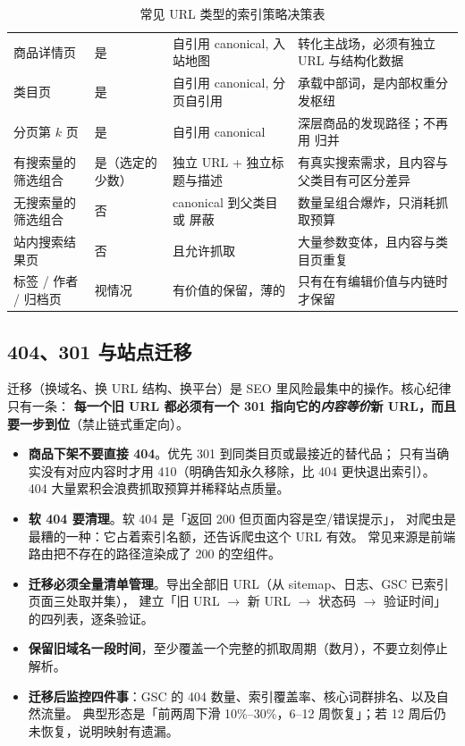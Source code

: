 \begin{table}[htbp]
\centering
\caption{常见 URL 类型的索引策略决策表}
\label{tab:urlpolicy}
\small
\begin{tabularx}{\textwidth}{L{2.7cm} L{2.0cm} L{2.2cm} Y}
\toprule
{} &  &  &  \\
\midrule
商品详情页 & 是 & 自引用 canonical, 入站地图 & 转化主战场，必须有独立 URL 与结构化数据 \\
类目页 & 是 & 自引用 canonical, 分页自引用 & 承载中部词，是内部权重分发枢纽 \\
分页第 $k$ 页 & 是 & 自引用 canonical & 深层商品的发现路径；不再用  归并 \\
有搜索量的筛选组合 & 是（选定的少数） & 独立 URL + 独立标题与描述 & 有真实搜索需求，且内容与父类目有可区分差异 \\
无搜索量的筛选组合 & 否 & canonical 到父类目或  屏蔽 & 数量呈组合爆炸，只消耗抓取预算 \\
站内搜索结果页 & 否 &  且允许抓取 & 大量参数变体，且内容与类目页重复 \\
标签 / 作者 / 归档页 & 视情况 & 有价值的保留，薄的  & 只有在有编辑价值与内链时才保留 \\
\bottomrule
\end{tabularx}
\end{table}

\subsection{404、301 与站点迁移}

迁移（换域名、换 URL 结构、换平台）是 SEO 里风险最集中的操作。核心纪律只有一条：
\textbf{每一个旧 URL 都必须有一个 301 指向它的\emph{内容等价}新 URL，而且要一步到位}（禁止链式重定向）。

\begin{itemize}
  \item \textbf{商品下架不要直接 404}。优先 301 到同类目页或最接近的替代品；
        只有当确实没有对应内容时才用 410（明确告知永久移除，比 404 更快退出索引）。
        404 大量累积会浪费抓取预算并稀释站点质量。
  \item \textbf{软 404 要清理}。软 404 是「返回 200 但页面内容是空/错误提示」，
        对爬虫是最糟的一种：它占着索引名额，还告诉爬虫这个 URL 有效。
        常见来源是前端路由把不存在的路径渲染成了 200 的空组件。
  \item \textbf{迁移必须全量清单管理}。导出全部旧 URL（从 sitemap、日志、GSC 已索引页面三处取并集），
        建立「旧 URL $\to$ 新 URL $\to$ 状态码 $\to$ 验证时间」的四列表，逐条验证。
  \item \textbf{保留旧域名一段时间}，至少覆盖一个完整的抓取周期（数月），不要立刻停止解析。
  \item \textbf{迁移后监控四件事}：GSC 的 404 数量、索引覆盖率、核心词群排名、以及自然流量。
        典型形态是「前两周下滑 10\%--30\%，6--12 周恢复」；若 12 周后仍未恢复，说明映射有遗漏。
\end{itemize}

